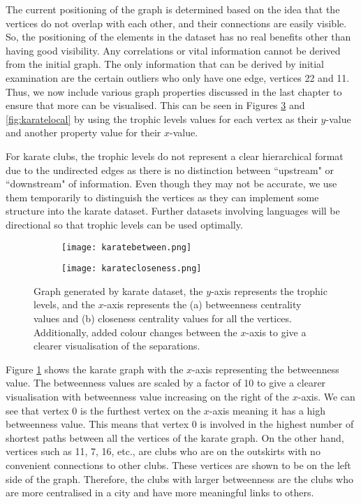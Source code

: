 The current positioning of the graph is determined based on the idea that the vertices do not overlap with each other, and their connections are easily visible. So, the positioning of the elements in the dataset has no real benefits other than having good visibility. Any correlations or vital information cannot be derived from the initial graph. The only information that can be derived by initial examination are the certain outliers who only have one edge, vertices 22 and 11. Thus, we now include various graph properties discussed in the last chapter to ensure that more can be visualised. This can be seen in Figures \ref{fig:karatecentrality} and \ref{fig:karatelocal} by using the trophic levels values for each vertex as their $y$-value and another property value for their $x$-value.

For karate clubs, the trophic levels do not represent a clear hierarchical format due to the undirected edges as there is no distinction between ``upstream" or ``downstream" of information. Even though they may not be accurate, we use them temporarily to distinguish the vertices as they can implement some structure into the karate dataset. Further datasets involving languages will be directional so that trophic levels can be used optimally.

\begin{figure}[!htb]
\centering
\begin{subfigure}{.45\textwidth}
	\hspace{-2cm}
	\texttt{[image: karatebetween.png]}
	\caption{}
	\label{fig:karatea}
\end{subfigure}
\begin{subfigure}{.45\textwidth}
	\texttt{[image: karatecloseness.png]}
	\caption{}
	\label{fig:karateb}
\end{subfigure}
\caption{Graph generated by karate dataset, the $y$-axis represents the trophic levels, and the $x$-axis represents the (a) betweenness centrality values and (b) closeness centrality values for all the vertices. Additionally, added colour changes between the $x$-axis to give a clearer visualisation of the separations.}
\label{fig:karatecentrality}
\end{figure}

Figure \ref{fig:karatea} shows the karate graph with the $x$-axis representing the betweenness value. The betweenness values are scaled by a factor of 10 to give a clearer visualisation with betweenness value increasing on the right of the $x$-axis. We can see that vertex 0 is the furthest vertex on the $x$-axis meaning it has a high betweenness value. This means that vertex 0 is involved in the highest number of shortest paths between all the vertices of the karate graph. On the other hand, vertices such as 11, 7, 16, etc., are clubs who are on the outskirts with no convenient connections to other clubs. These vertices are shown to be on the left side of the graph. Therefore, the clubs with larger betweenness are the clubs who are more centralised in a city and have more meaningful links to others.

